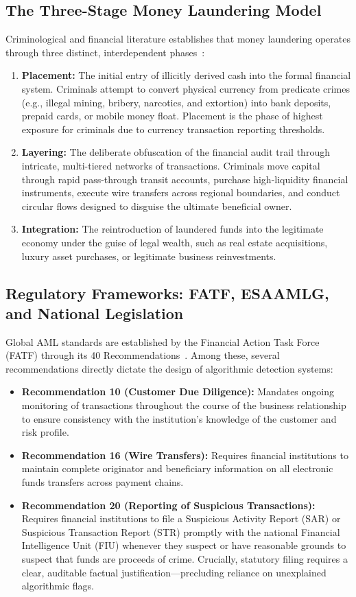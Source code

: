 \subsection{The Three-Stage Money Laundering Model}
Criminological and financial literature establishes that money laundering operates through three distinct, interdependent phases~\cite{korejo2021concept, morselli2009inside}:
\begin{enumerate}
    \item \textbf{Placement:} The initial entry of illicitly derived cash into the formal financial system. Criminals attempt to convert physical currency from predicate crimes (e.g., illegal mining, bribery, narcotics, and extortion) into bank deposits, prepaid cards, or mobile money float. Placement is the phase of highest exposure for criminals due to currency transaction reporting thresholds.
    \item \textbf{Layering:} The deliberate obfuscation of the financial audit trail through intricate, multi-tiered networks of transactions. Criminals move capital through rapid pass-through transit accounts, purchase high-liquidity financial instruments, execute wire transfers across regional boundaries, and conduct circular flows designed to disguise the ultimate beneficial owner.
    \item \textbf{Integration:} The reintroduction of laundered funds into the legitimate economy under the guise of legal wealth, such as real estate acquisitions, luxury asset purchases, or legitimate business reinvestments.
\end{enumerate}

\subsection{Regulatory Frameworks: FATF, ESAAMLG, and National Legislation}
Global AML standards are established by the Financial Action Task Force (FATF) through its 40 Recommendations~\cite{fatf2023consolidated}. Among these, several recommendations directly dictate the design of algorithmic detection systems:
\begin{itemize}
    \item \textbf{Recommendation 10 (Customer Due Diligence):} Mandates ongoing monitoring of transactions throughout the course of the business relationship to ensure consistency with the institution's knowledge of the customer and risk profile.
    \item \textbf{Recommendation 16 (Wire Transfers):} Requires financial institutions to maintain complete originator and beneficiary information on all electronic funds transfers across payment chains.
    \item \textbf{Recommendation 20 (Reporting of Suspicious Transactions):} Requires financial institutions to file a Suspicious Activity Report (SAR) or Suspicious Transaction Report (STR) promptly with the national Financial Intelligence Unit (FIU) whenever they suspect or have reasonable grounds to suspect that funds are proceeds of crime. Crucially, statutory filing requires a clear, auditable factual justification---precluding reliance on unexplained algorithmic flags.
\end{itemize}

